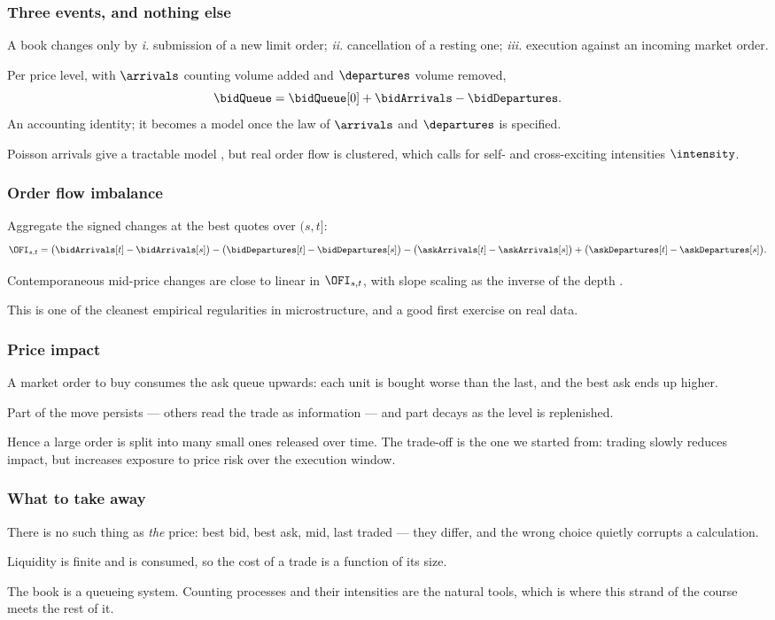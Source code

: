 \begin{frame}
  \frametitle{Three events, and nothing else}
A book changes only by
\emph{i.} submission of a new limit order;
\emph{ii.} cancellation of a resting one;
\emph{iii.} execution against an incoming market order.

\pause

Per price level, with $\arrivals$ counting volume added and $\departures$ volume removed,
\[
\bidQueue = \bidQueue[0] + \bidArrivals - \bidDepartures.
\]
An accounting identity; it becomes a model once the law of $\arrivals$ and $\departures$
is specified.

\pause

Poisson arrivals give a tractable model \citep{CST10sto},
but real order flow is clustered,
which calls for self- and cross-exciting intensities $\intensity$.
\end{frame}

\begin{frame}
  \frametitle{Order flow imbalance}
Aggregate the signed changes at the best quotes over $(s,t]$:
\[
\OFI_{s,t} =
\big(\bidArrivals[t] - \bidArrivals[s]\big)
- \big(\bidDepartures[t] - \bidDepartures[s]\big)
- \big(\askArrivals[t] - \askArrivals[s]\big)
+ \big(\askDepartures[t] - \askDepartures[s]\big).
\]

\pause

Contemporaneous mid-price changes are close to linear in $\OFI_{s,t}$,
with slope scaling as the inverse of the depth \citep{CKS14pri}.

This is one of the cleanest empirical regularities in microstructure,
and a good first exercise on real data.
\end{frame}

\begin{frame}
  \frametitle{Price impact}
A market order to buy consumes the ask queue upwards:
each unit is bought worse than the last,
and the best ask ends up higher.

\pause

Part of the move persists --- others read the trade as information ---
and part decays as the level is replenished.

\pause

Hence a large order is split into many small ones released over time.
The trade-off is the one we started from:
trading slowly reduces impact,
but increases exposure to price risk over the execution window.
\end{frame}

\begin{frame}
  \frametitle{What to take away}
There is no such thing as \emph{the} price:
best bid, best ask, mid, last traded --- they differ,
and the wrong choice quietly corrupts a calculation.

\pause

Liquidity is finite and is consumed,
so the cost of a trade is a function of its size.

\pause

The book is a queueing system.
Counting processes and their intensities are the natural tools,
which is where this strand of the course meets the rest of it.
\end{frame}
